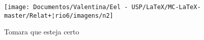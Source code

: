 \documentclass{book}
\begin{document}
	
	\begin{figure}[!h]
		\centering
	\texttt{[image: Documentos/Valentina/Eel - USP/LaTeX/MC-LaTeX-master/Relat+¦rio6/imagens/n2]}
	\caption{Tomara que esteja certo}
	\end{figure}
\end{document}
